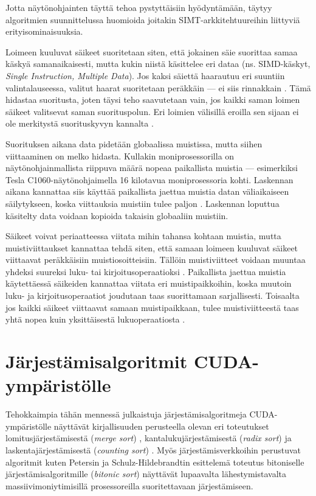 \documentclass[a4paper,11pt]{article}
\newcommand{\engl}[1]{\foreignlanguage{english}{\em #1}}
\begin{document}
Jotta näytönohjainten täyttä tehoa pystyttäisiin hyödyntämään, täytyy algoritmien suunnittelussa huomioida joitakin SIMT-arkkitehtuureihin liittyviä erityisominaisuuksia.

Loimeen kuuluvat säikeet suoritetaan siten, että jokainen säie suorittaa samaa käskyä samanaikaisesti, mutta kukin niistä käsittelee eri dataa (ns. SIMD-käskyt, \engl{Single Instruction, Multiple Data}). Jos kaksi säiettä haarautuu eri suuntiin valintalauseessa, valitut haarat suoritetaan peräkkäin --- ei siis rinnakkain \cite{leischner2010} \cite{cederman2009}. Tämä hidastaa suoritusta, joten täysi teho saavutetaan vain, jos kaikki saman loimen säikeet valitsevat saman suorituspolun. Eri loimien välisillä eroilla sen sijaan ei ole merkitystä suorituskyvyn kannalta \cite{leischner2010} \cite{satish2009}.

Suorituksen aikana data pidetään globaalissa muistissa, mutta siihen viittaaminen on melko hidasta. Kullakin moniprosessorilla on näytönohjainmallista riippuva määrä nopeaa paikallista muistia --- esimerkiksi Tesla C1060-näytönohjaimella 16 kilotavua moniprosessoria kohti. Laskennan aikana kannattaa siis käyttää paikallista jaettua muistia datan väliaikaiseen säilytykseen, koska viittauksia muistiin tulee paljon \cite{cederman2009} \cite{leischner2010}. Laskennan loputtua käsitelty data voidaan kopioida takaisin globaaliin muistiin.

Säikeet voivat periaatteessa viitata mihin tahansa kohtaan muistia, mutta muistiviittaukset kannattaa tehdä siten, että samaan loimeen kuuluvat säikeet viittaavat peräkkäisiin muistiosoitteisiin. Tällöin muistiviitteet voidaan muuntaa yhdeksi suureksi luku- tai kirjoitusoperaatioksi \cite{cederman2009} \cite{satish2009}. Paikallista jaettua muistia käytettäessä säikeiden kannattaa viitata eri muistipaikkoihin, koska muutoin luku- ja kirjoitusoperaatiot joudutaan taas suorittamaan sarjallisesti. Toisaalta jos kaikki säikeet viittaavat samaan muistipaikkaan, tulee muistiviitteestä taas yhtä nopea kuin yksittäisestä lukuoperaatiosta \cite{cederman2009}.

\section{Järjestämisalgoritmit CUDA-ympäristölle}

Tehokkaimpia tähän mennessä julkaistuja järjestämisalgoritmeja CUDA-ympäristölle näyttävät kirjallisuuden perusteella olevan eri toteutukset lomitusjärjestämisestä (\engl{merge sort}) \cite{satish2009} \cite{satish2010}, kantalukujärjestämisestä (\engl{radix sort}) \cite{satish2009} \cite{merrill2010} \cite{satish2010} ja laskentajärjestämisestä (\engl{counting sort}) \cite{kolonias2011}. Myös järjestämisverkkoihin perustuvat algoritmit kuten Petersin ja Schulz-Hildebrandtin \cite{peters2012gems} esittelemä toteutus bitoniselle järjestämisalgoritmille (\engl{bitonic sort}) näyttävät lupaavalta lähestymistavalta massiivimoniytimisillä prosessoreilla suoritettavaan järjestämiseen.
\end{document}
